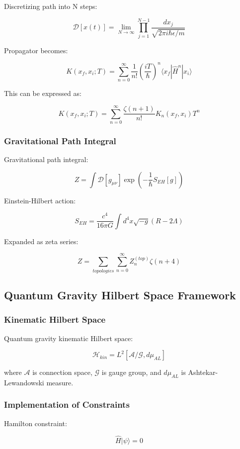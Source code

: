 \documentclass[12pt,a4paper]{article}
\begin{document}
Discretizing path into N steps:

$$\mathcal{D}[x(t)] = \lim_{N \to \infty} \prod_{j=1}^{N-1} \frac{dx_j}{\sqrt{2\pi i\hbar\epsilon/m}}$$

Propagator becomes:

$$K(x_f, x_i; T) = \sum_{n=0}^{\infty} \frac{1}{n!} \left(\frac{iT}{\hbar}\right)^n \langle x_f | \hat{H}^n | x_i \rangle$$

This can be expressed as:

$$K(x_f, x_i; T) = \sum_{n=0}^{\infty} \frac{\zeta(n+1)}{n!} K_n(x_f, x_i) T^n$$

\subsubsection{Gravitational Path Integral}

Gravitational path integral:

$$Z = \int \mathcal{D}[g_{\mu\nu}] \exp\left(-\frac{1}{\hbar} S_{EH}[g]\right)$$

Einstein-Hilbert action:

$$S_{EH} = \frac{c^4}{16\pi G} \int d^4x \sqrt{-g} (R - 2\Lambda)$$

Expanded as zeta series:

$$Z = \sum_{topologies} \sum_{n=0}^{\infty} Z_n^{(top)} \zeta(n+4)$$

\subsection{Quantum Gravity Hilbert Space Framework}

\subsubsection{Kinematic Hilbert Space}

Quantum gravity kinematic Hilbert space:

$$\mathcal{H}_{kin} = L^2[\mathcal{A}/\mathcal{G}, d\mu_{AL}]$$

where $\mathcal{A}$ is connection space, $\mathcal{G}$ is gauge group, and $d\mu_{AL}$ is Ashtekar-Lewandowski measure.

\subsubsection{Implementation of Constraints}

Hamilton constraint:

$$\hat{H} |\psi\rangle = 0$$
\end{document}
